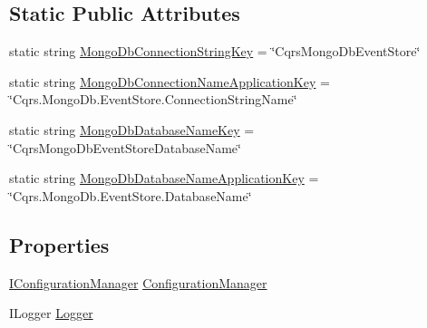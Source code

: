 \subsection*{Static Public Attributes}
\begin{DoxyCompactItemize}
\item 
static string \hyperlink{classCqrs_1_1MongoDB_1_1Events_1_1MongoDbEventStoreConnectionStringFactory_a0e1916a92e01f0b5cf15695478170d68_a0e1916a92e01f0b5cf15695478170d68}{Mongo\+Db\+Connection\+String\+Key} = \char`\"{}Cqrs\+Mongo\+Db\+Event\+Store\char`\"{}
\item 
static string \hyperlink{classCqrs_1_1MongoDB_1_1Events_1_1MongoDbEventStoreConnectionStringFactory_a90c864fa4298dc679abe4e264d17cf04_a90c864fa4298dc679abe4e264d17cf04}{Mongo\+Db\+Connection\+Name\+Application\+Key} = \char`\"{}Cqrs.\+Mongo\+Db.\+Event\+Store.\+Connection\+String\+Name\char`\"{}
\item 
static string \hyperlink{classCqrs_1_1MongoDB_1_1Events_1_1MongoDbEventStoreConnectionStringFactory_a5ea3576b77bf46894277b0bba8f5d2bb_a5ea3576b77bf46894277b0bba8f5d2bb}{Mongo\+Db\+Database\+Name\+Key} = \char`\"{}Cqrs\+Mongo\+Db\+Event\+Store\+Database\+Name\char`\"{}
\item 
static string \hyperlink{classCqrs_1_1MongoDB_1_1Events_1_1MongoDbEventStoreConnectionStringFactory_afcf5a4f8e445742625b9ca45bc455247_afcf5a4f8e445742625b9ca45bc455247}{Mongo\+Db\+Database\+Name\+Application\+Key} = \char`\"{}Cqrs.\+Mongo\+Db.\+Event\+Store.\+Database\+Name\char`\"{}
\end{DoxyCompactItemize}
\subsection*{Properties}
\begin{DoxyCompactItemize}
\item 
\hyperlink{interfaceCqrs_1_1Configuration_1_1IConfigurationManager}{I\+Configuration\+Manager} \hyperlink{classCqrs_1_1MongoDB_1_1Events_1_1MongoDbEventStoreConnectionStringFactory_ae551f6493cce791272dcbfbedf8c18bf_ae551f6493cce791272dcbfbedf8c18bf}{Configuration\+Manager}
\item 
I\+Logger \hyperlink{classCqrs_1_1MongoDB_1_1Events_1_1MongoDbEventStoreConnectionStringFactory_a13fe1d0f10313e37c9eb1788db98cb23_a13fe1d0f10313e37c9eb1788db98cb23}{Logger}
\end{DoxyCompactItemize}


